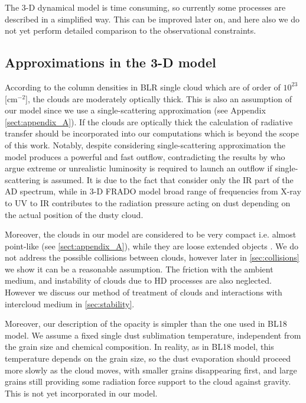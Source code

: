 \documentclass[twocolumn]{aastex62}
\begin{document}
The 3-D dynamical model is time consuming, so currently some processes are described in a simplified way. This can be improved later on, and here also we do not yet perform detailed comparison to the observational constraints.

\subsection{Approximations in the 3-D model}\label{sec:approx3D}

According to the column densities in BLR single cloud \citep{Bianchi2012} which are of order of $10^{23}$ [cm$^{-2}$], the clouds are moderately optically thick. This is also an assumption of our model since we use a single-scattering approximation (see Appendix \ref{sect:appendix_A}). If the clouds are optically thick the calculation of radiative transfer should be incorporated into our computations which is beyond the scope of this work. Notably, despite considering single-scattering approximation the model produces a powerful and fast outflow, contradicting the results by \citet{Costa2018} who argue extreme or unrealistic luminosity is required to launch an outflow if single-scattering is assumed. It is due to the fact that \citet{Costa2018} consider only the IR part of the AD spectrum, while in 3-D FRADO model broad range of frequencies from X-ray to UV to IR contributes to the radiation pressure acting on dust depending on the actual position of the dusty cloud.

Moreover, the clouds in our model are considered to be very compact i.e. almost point-like (see \ref{sect:appendix_A}), while they are loose extended objects \citep{Bianchi2012}.
We do not address the possible collisions between clouds, however later in \ref{sec:collisions} we show it can be a reasonable assumption. The friction with the ambient medium, and instability of clouds due to HD processes are also neglected. However we discuss our method of treatment of clouds and interactions with intercloud medium in \ref{sec:stability}.

Moreover, our description of the opacity is simpler than the one used in BL18 model. We assume a fixed single dust sublimation temperature, independent from the grain size and chemical composition. In reality, as in BL18 model, this temperature depends on the grain size, so the dust evaporation should proceed more slowly as the cloud moves, with smaller grains disappearing first, and large grains still providing some radiation force support to the cloud against gravity. This is not yet incorporated in our model.
\end{document}
